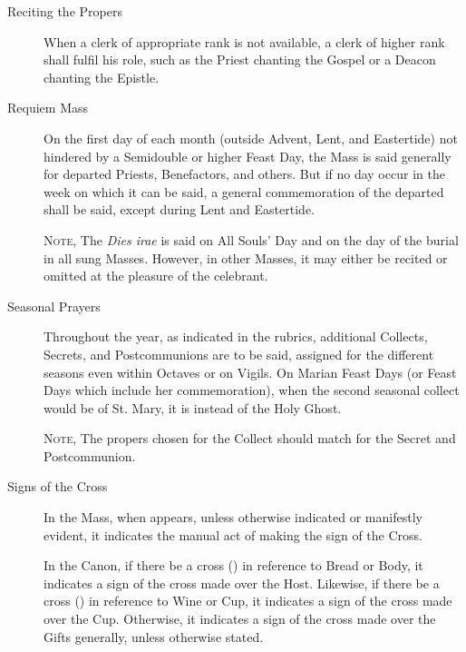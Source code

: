 \begin{description}
    \item[Reciting the Propers] When a clerk of appropriate rank is not available, a clerk of higher rank shall fulfil his role, such as the Priest chanting the Gospel or a Deacon chanting the Epistle.
    \item[Requiem Mass] On the first day of each month (outside Advent, Lent, and Eastertide) not hindered by a Semidouble or higher Feast Day, the Mass is said generally for departed Priests, Benefactors, and others. But if no day occur in the week on which it can be said, a general commemoration of the departed shall be said, except during Lent and Eastertide.\par
    \textsc{Note,} The \emph{Dies irae} is said on All Souls' Day and on the day of the burial in all sung Masses. However, in other Masses, it may either be recited or omitted at the pleasure of the celebrant.
    \item[Seasonal Prayers] Throughout the year, as indicated in the rubrics, additional Collects, Secrets, and Postcommunions are to be said, assigned for the different seasons even within Octaves or on Vigils. On Marian Feast Days (or Feast Days which include her commemoration), when the second seasonal collect would be of St. Mary, it is instead of the Holy Ghost.\par
    \textsc{Note,} The propers chosen for the Collect should match for the Secret and Postcommunion.
    \item[Signs of the Cross] In the Mass, when {} appears, unless otherwise indicated or manifestly evident, it indicates the manual act of making the sign of the Cross.\par
    In the Canon, if there be a cross ({}) in reference to Bread or Body, it indicates a sign of the cross made over the Host. Likewise, if there be a cross ({}) in reference to Wine or Cup, it indicates a sign of the cross made over the Cup. Otherwise, it indicates a sign of the cross made over the Gifts generally, unless otherwise stated.\par

\end{description}

